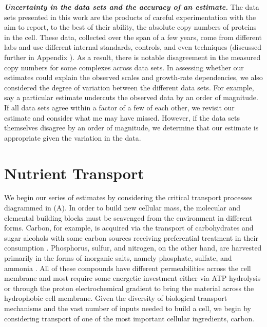\begin{featurebox}
\textbf{\itshape Uncertainty in the data sets and the accuracy of an estimate.}
The data sets presented in this work are the products of
careful experimentation with the aim to report, to the best of their ability,
the absolute copy numbers of proteins in the cell. These data, collected over
the span of a few years, come from different labs and use different internal
standards, controls, and even techniques (discussed further in Appendix ).
As a result, there is notable disagreement in the measured copy numbers for
some complexes across data sets. In assessing whether our estimates could explain the
observed scales and growth-rate dependencies, we also considered the degree of
variation between the different data sets. For example, say a particular
estimate undercuts the observed data by an order of magnitude. If all data sets
agree within a factor of a few of each other, we revisit our estimate and
consider what me may have missed. However, if the data sets themselves disagree
by an order of magnitude, we determine that our estimate is
appropriate given the variation in the data.
\label{box:estimate_rules}
\end{featurebox}


\section{Nutrient Transport}
We begin our series of estimates by considering the critical transport
processes diagrammed in (A). In order to build new cellular
mass, the molecular and elemental building blocks must be scavenged from the
environment in different forms. Carbon, for example, is acquired via the
transport of carbohydrates and sugar alcohols with some carbon sources
receiving preferential treatment in their consumption \citep{monod1947}.
Phosphorus, sulfur, and nitrogen, on the other hand, are harvested primarily
in the forms of inorganic salts, namely phosphate, sulfate, and ammonia
\citep{jun2018, assentoft2016, stasi2019, antonenko1997, rosenberg1977,
willsky1973}. All of these compounds have different permeabilities across the
cell membrane \cite{phillips2018} and most require some energetic investment
either via ATP hydrolysis or through the proton electrochemical gradient to
bring the material across the hydrophobic cell membrane. Given the diversity
of biological transport mechanisms and the vast number of inputs needed to
build a cell, we begin by considering transport of one of the most important
cellular ingredients, carbon.

